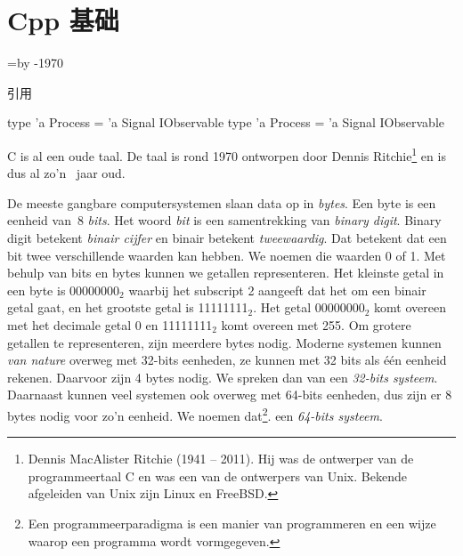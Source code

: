 \documentclass[12pt,a4paper,final,twoside,fleqn]{book}
\begin{document}
\frontmatter
\maketitle


\tableofcontents
\mainmatter
\chapter{Cpp 基础}
\label{cha:cpp-base}

\newcount\cdifference\cdifference=\the\year\advance\cdifference by -1970

引用\cite{1989programming}

\begin{code}
  type 'a Process = 'a Signal IObservable
  type 'a Process = 'a Signal IObservable
\end{code}



C is al een oude taal. De taal is rond 1970 ontworpen door Dennis Ritchie\footnote{Dennis MacAlister Ritchie (1941 -- 2011). Hij was de ontwerper van de programmeertaal C en was een van de ontwerpers van Unix. Bekende afgeleiden van Unix zijn Linux en FreeBSD.} en is dus al zo'n \the\cdifference\ jaar oud.

\begin{infobox}
  De meeste gangbare computersystemen slaan data op in \textsl{bytes}. Een byte is een eenheid van~8 \textsl{bits}. Het woord \textsl{bit} is een samentrekking van \textsl{binary digit}. Binary digit betekent \textsl{binair cijfer} en binair betekent \textsl{tweewaardig}. Dat betekent dat een bit twee verschillende waarden kan hebben. We noemen die waarden 0 of 1. Met behulp van bits en bytes kunnen we getallen representeren. Het kleinste getal in een byte is 00000000$_2$ waarbij het subscript 2 aangeeft dat het om een binair getal gaat, en het grootste getal is 11111111$_2$. Het getal 00000000$_2$ komt overeen met het decimale getal 0 en 11111111$_2$ komt overeen met 255. Om grotere getallen te representeren, zijn meerdere bytes nodig. Moderne systemen kunnen \textsl{van nature} overweg met 32-bits eenheden, ze kunnen met 32 bits als één eenheid rekenen. Daarvoor zijn 4 bytes nodig. We spreken dan van een \textsl{32-bits systeem}. Daarnaast kunnen veel systemen ook overweg met 64-bits eenheden, dus zijn er 8 bytes nodig voor zo'n eenheid. We noemen dat\footnote{Een programmeerparadigma is een manier van programmeren en een wijze waarop een programma wordt vormgegeven.}. een \textsl{64-bits systeem}.
\end{infobox}
\end{document}
